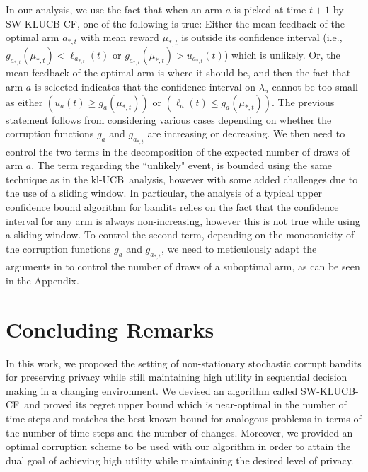 \documentclass[letterpaper]{article} %
\newcommand{\SWKLUCBCF}{\textsc{SW-KLUCB-CF}}
\newcommand{\KLUCB}{$\mathrm{kl}$-\textsc{UCB}}
\newcommand{\optArm}[1]{a_{*, #1}}
\newcommand{\optMean}[1]{\mu_{*, #1}}
\begin{document}
In our analysis, we use the fact that when an arm $a$ is picked at time $t+1$ by \SWKLUCBCF, one of the following is true:
Either the mean feedback of the optimal arm $\optArm{t}$ with mean reward $\optMean{t}$ is outside its confidence interval (i.e., $g_{\optArm{t}}(\optMean{t}) < \ell_{\optArm{t}}(t)$ or $g_{\optArm{t}}(\optMean{t}) > u_{\optArm{t}}(t)$) which is unlikely. Or,
the mean feedback of the optimal arm is where it should be, and then the fact that arm $a$ is selected indicates that the confidence interval on $\lambda_a$ cannot be too small as either $(u_a(t) \geq g_a(\optMean{t}))$ or $(\ell_a(t) \leq g_a(\optMean{t}))$.
The previous statement follows from considering various cases depending on whether the corruption functions $g_a$ and $g_{\optArm{t}}$ are increasing or decreasing.
We then need to control the two terms in the decomposition of the expected number of draws of arm $a$. The term regarding the ``unlikely" event, is bounded using the same technique as in the \KLUCB \ analysis, however with some added challenges due to the use of a sliding window. In particular, the analysis of a typical upper confidence bound algorithm for bandits relies on the fact that the confidence interval for any arm is always non-increasing, however this is not true while using a sliding window. To control the second term, depending on the monotonicity of the corruption functions $g_a$ and $g_{\optArm{t}}$, we need to meticulously adapt the arguments in \citet{KLUCBJournal} to control the number of draws of a suboptimal arm, as can be seen in the Appendix.

\vspace{-0.84mm}
\section{Concluding Remarks}
In this work, we proposed the setting of non-stationary stochastic corrupt bandits for preserving privacy while still maintaining high utility in sequential decision making in a changing environment. We devised an algorithm called \SWKLUCBCF \ and proved its regret upper bound which is near-optimal in the number of time steps and matches the best known bound for analogous problems in terms of the number of time steps and the number of changes. Moreover, we provided an optimal corruption scheme to be used with our algorithm in order to attain the dual goal of achieving high utility while maintaining the desired level of privacy.
\end{document}
